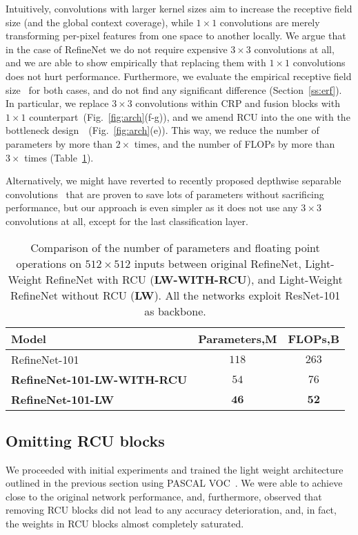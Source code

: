 \documentclass{bmvc2k}
\begin{document}
Intuitively, convolutions with larger kernel sizes aim to increase the receptive field size (and the global context coverage), while $1\times1$ convolutions are merely transforming per-pixel features from one space to another locally. We argue that in the case of RefineNet we do not require expensive $3\times3$ convolutions at all, and we are able to show empirically that replacing them with $1\times1$ convolutions does not hurt performance. Furthermore, we evaluate the empirical receptive field size~\cite{ZhouKLOT14} for both cases, and do not find any significant difference (Section~\ref{ss:erf}). 
In particular, we replace $3\times3$ convolutions within CRP and fusion blocks with $1\times1$ counterpart~(Fig.~\ref{fig:arch}(f-g)), and we amend RCU into the one with the bottleneck design~\cite{HeZRS16}~(Fig.~\ref{fig:arch}(e)). This way,  we reduce the number of parameters by more than $2\times$ times, and  the number of FLOPs by more than $3\times$ times (Table~\ref{table:r101}).
	
Alternatively, we might have reverted to recently proposed depthwise separable convolutions~\cite{Chollet17} that are proven to save lots of parameters without sacrificing performance, but our approach is even simpler as it does not use any $3\times3$ convolutions at all, except for the last classification layer.
	
\begin{table}
	\begin{center}
		\begin{tabular}{l|c|c}
			\hline Model & Parameters,M & FLOPs,B\\
\hline
RefineNet-101~\cite{LinMSR17} & $118$ & $263$\\
			\textbf{RefineNet-101-LW-WITH-RCU}  & $54$ & $76$\\
			\textbf{RefineNet-101-LW}  & $\textbf{46}$ & $\textbf{52}$\\
			\hline
		\end{tabular}
	\end{center}
	\caption{Comparison of the number of parameters and floating point operations on $512\times512$ inputs between original RefineNet, Light-Weight RefineNet with RCU (\textbf{LW-WITH-RCU}), and Light-Weight RefineNet without RCU (\textbf{LW}). All the networks exploit ResNet-101 as backbone.\label{table:r101}}
	\vskip -0.2in
\end{table}


\subsection{Omitting RCU blocks}
\label{rcu_red}
We proceeded with initial experiments and trained the light weight architecture outlined in the previous section using PASCAL VOC~\cite{EveringhamGWWZ10}. We were able to achieve close to the original network performance, and, furthermore, observed that removing RCU blocks did not lead to any accuracy deterioration, and, in fact, the weights in RCU blocks almost completely saturated.
\end{document}
